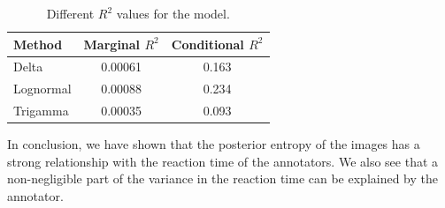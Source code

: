 \begin{table}[H]
  \centering
  \begin{tabular}{lcc}
  \toprule
  \textbf{Method} & \textbf{Marginal $R^2$} & \textbf{Conditional $R^2$} \\
  \midrule
  Delta & 0.00061 & 0.163 \\
  Lognormal & 0.00088 & 0.234 \\
  Trigamma & 0.00035 & 0.093 \\
  \bottomrule
  \end{tabular}
  \caption{Different $R^2$ values for the model.}
  \label{tab:R2}
\end{table}

In conclusion, we have shown that the posterior entropy of the images has a strong relationship
with the reaction time of the annotators. We also see that a non-negligible part of
the variance in the reaction time can be explained by the annotator.



